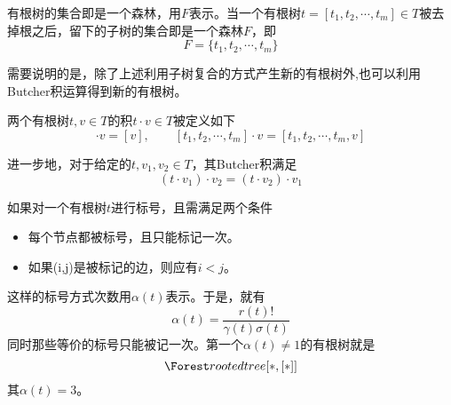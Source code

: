 有根树的集合即是一个森林，用$F$表示。当一个有根树$t=[t_1,t_2,\cdots,t_m]\in T$被去掉根之后，留下的子树的集合即是一个森林$F$，即
\begin{equation*}
F=\{t_1,t_2,\cdots,t_m\}
\end{equation*}

需要说明的是，除了上述利用子树复合的方式产生新的有根树外,也可以利用Butcher积运算得到新的有根树。
\begin{definition}
两个有根树$t,v\in T$的积$t\cdot v\in T$被定义如下
\begin{equation}
[\varnothing]\cdot v=[v],\qquad [t_1,t_2,\cdots,t_m]\cdot v=[t_1,t_2,\cdots,t_m,v]
\end{equation}
\end{definition}

进一步地，对于给定的$t,v_1,v_2\in T$，其Butcher积满足
\begin{equation}
(t\cdot v_1)\cdot v_2=(t\cdot v_2)\cdot v_1
\end{equation}

如果对一个有根树$t$进行标号，且需满足两个条件
\begin{itemize}
\item 每个节点都被标号，且只能标记一次。
\item 如果(i,j)是被标记的边，则应有$i<j$。
\end{itemize}
这样的标号方式次数用$\alpha(t)$表示。于是，就有
\begin{equation}
\alpha(t)=\frac{r(t)!}{\gamma(t)\sigma(t)}
\end{equation}
同时那些等价的标号只能被记一次。第一个$\alpha(t)\neq1$的有根树就是
\begin{equation*}
\rootedtree [*,[*]]
\end{equation*}
其$\alpha(t)=3$。

